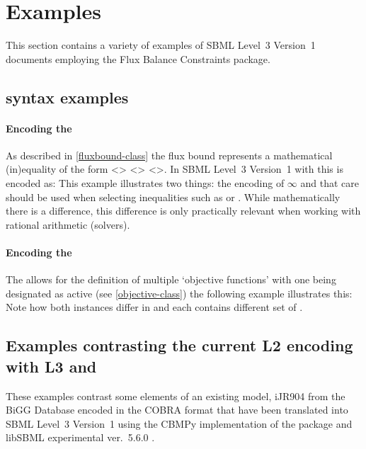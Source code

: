 
\section{Examples}
\label{examples}

This section contains a variety of examples of SBML Level~3 Version~1
documents employing the Flux Balance Constraints package.

\subsection{\FBC syntax examples}

\paragraph{Encoding the \FluxBound}
As described in \ref{fluxbound-class} the flux bound represents a mathematical (in)equality of the form <> <> <>. In SBML Level~3 Version~1 with \FBC this is encoded as: 
%
%
This example illustrates two things: the encoding of $\infty$ and that care should be used when selecting inequalities such as \value{less} or \value{greater}. While mathematically there is a difference, this difference is only practically relevant when working with rational arithmetic (solvers).

\paragraph{Encoding the \Objective}
The \FBC allows for the definition of multiple `objective functions' with one being designated as active (see \ref{objective-class}) the following example illustrates this:
%
%
Note how both \Objective instances differ in  and each contains different set of .


\subsection{Examples contrasting the current \SBML L2 encoding with L3 and \FBC}
These examples contrast some elements of an existing model, iJR904 from the \textsf{BiGG} Database encoded in the \textsf{COBRA} format \cite{ijr904, bigg, cobra} that have been translated into SBML Level~3 Version~1 using the \textsf{CBMPy} implementation of the \FBC package \cite{pysces, cbmpy} and \textsf{libSBML} experimental ver.~5.6.0 \cite{libsbml}.


